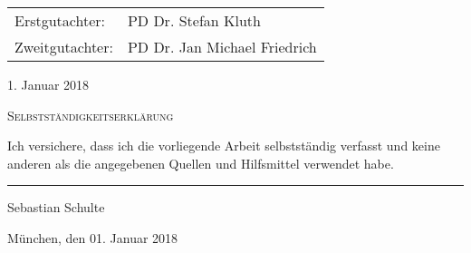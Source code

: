 \begin{titlepage}
\begin{center}
\begin{table}[htbp]
			\begin{tabular}{ l l }
				Erstgutachter: & PD Dr. Stefan Kluth\\			
			Zweitgutachter: & PD Dr. Jan Michael Friedrich\\
				
				
				
			\end{tabular}
		\end{table}
	
		\vspace{2cm}
	1. Januar 2018
		\vfill
		
		
	\end{center}%
	
	
\end{titlepage}


\cleardoublepage

\vspace*{0.2\textheight}

\begin{declaration}
	
	\textsc{\huge Selbstständigkeitserklärung }\\[0.9cm] %
	
	\vspace{4.0cm}
	
	\noindent Ich versichere, dass ich die vorliegende Arbeit selbstst\"andig verfasst und keine anderen als die angegebenen Quellen und Hilfsmittel verwendet habe.
	\vspace{1.5cm}

	

		\begin{flushright}
		\noindent\rule{5cm}{.4pt}\par
		Sebastian Schulte\par
		M\"unchen, den 01. Januar 2018\par
	\end{flushright}
	
\end{declaration}



